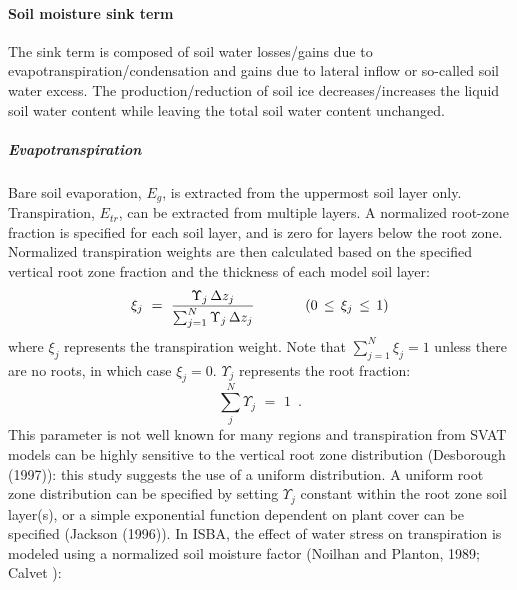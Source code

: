 \paragraph{Soil moisture sink term}
%
The sink term is composed of soil water 
losses/gains due to evapotranspiration/condensation
and gains due to lateral inflow or so-called soil
water excess. The production/reduction of soil ice
decreases/increases the liquid soil water content
while leaving the total soil water content unchanged.

\subparagraph{Evapotranspiration}
%
Bare soil evaporation, $E_g$, is extracted from
the uppermost soil layer only. Transpiration, $E_{tr}$,
can be extracted from multiple layers. A normalized root-zone
fraction is specified for each soil layer, and is zero
for layers below the root zone. 
Normalized transpiration weights are
then calculated based on the specified vertical root zone fraction and the
thickness of each model soil layer:
%
\begin{equation}
\label{etrwght}
\xi_j \,\,=\,\, {\Upsilon_j \, \Delta z_j \over
\sum_{j=1}^N \Upsilon_j \, \Delta z_j}
\hskip.5in
(0 \,\leq\, \xi_j \,\leq\, 1)
\end{equation}
%
%
where $\xi_j$ represents the transpiration weight.
Note that $\sum_{j=1}^N \xi_j = 1$ unless there are
no roots, in which case $\xi_j = 0$.
$\Upsilon_j$ represents the root fraction:
%
\begin{equation}
\sum_j^N \Upsilon_j \,\,=\,\, 1 \,\,\,.
\end{equation}
%
%
This parameter
is not well known for many regions and transpiration from SVAT
models can be highly sensitive to the vertical root zone distribution
(Desborough (1997)\nocite{Desborough1997}): this study suggests the use of a uniform distribution.
A uniform root zone distribution can be specified by
setting $\Upsilon_j$ constant within the root zone soil layer(s),
or a simple exponential function dependent on plant cover
can be specified (Jackson \etal (1996)\nocite{Jackson1996}).
%
In ISBA, the effect of water stress on transpiration
is modeled using a normalized soil moisture factor
(Noilhan and Planton, 1989; Calvet \nocite{Calvet1998a}):
%
\beq\label{normtheta}
%
